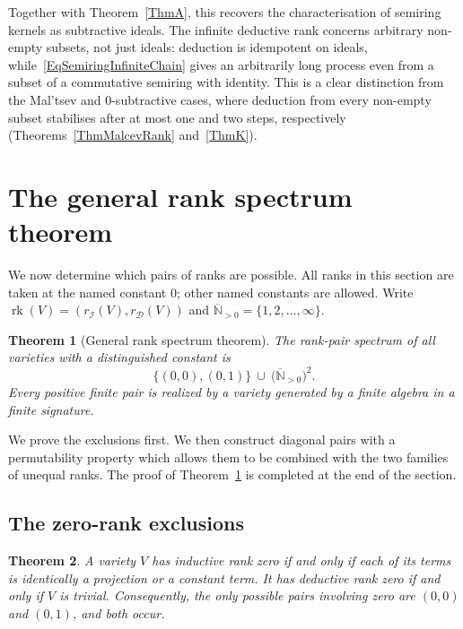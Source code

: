 \documentclass[12pt,english]{amsart}
\newtheorem{theorem}{Theorem}[section]
\theoremstyle{definition}
\numberwithin{equation}{section}
\theoremstyle{remark}
\begin{document}
Together with Theorem~\ref{ThmA}, this recovers the characterisation of semiring kernels as subtractive ideals. The infinite deductive rank concerns arbitrary non-empty subsets, not just ideals: deduction is idempotent on ideals, while~\eqref{EqSemiringInfiniteChain} gives an arbitrarily long process even from a subset of a commutative semiring with identity. This is a clear distinction from the Mal'tsev and $0$-subtractive cases, where deduction from every non-empty subset stabilises after at most one and two steps, respectively (Theorems~\ref{ThmMalcevRank} and~\ref{ThmK}).


\section{The general rank spectrum theorem}\label{SecRanks}

We now determine which pairs of ranks are possible. All ranks in this section are taken at the named constant $0$; other named constants are allowed. Write $\operatorname{rk}(V)=(r_{\mathcal I}(V),r_{\mathcal D}(V))$ and $\overline{\mathbb N}_{>0}=\{1,2,\ldots,\infty\}$.

\begin{theorem}[General rank spectrum theorem]\label{ThmCompleteSpectrum}
The rank-pair spectrum of all varieties with a distinguished constant is
\[
\{(0,0),(0,1)\}\ \cup\
\bigl(\overline{\mathbb N}_{>0}\bigr)^2.
\]
Every positive finite pair is realized by a variety generated by a finite algebra in a finite signature.
\end{theorem}

We prove the exclusions first. We then construct diagonal pairs with a permutability property which allows them to be combined with the two families of unequal ranks. The proof of Theorem~\ref{ThmCompleteSpectrum} is completed at the end of the section.

\subsection{The zero-rank exclusions}\label{SubsecRankZero}

\begin{theorem}\label{ThmRankZero}
A variety $V$ has inductive rank zero if and only if each of its terms is identically a projection or a constant term. It has deductive rank zero if and only if $V$ is trivial. Consequently, the only possible pairs involving zero are $(0,0)$ and $(0,1)$, and both occur.
\end{theorem}
\end{document}
